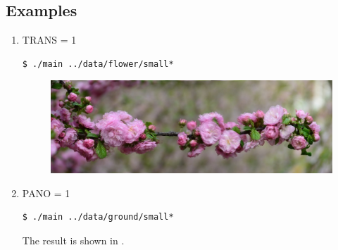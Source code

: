 \subsection{Examples}
\begin{enumerate}
\item TRANS = 1
  \begin{lstlisting}
$ ./main ../data/flower/small*
  \end{lstlisting}
\begin{figure}[H]
  \centering
  \includegraphics[scale=0.27]{res/flower.png}
\end{figure}


  \item PANO = 1
    \begin{lstlisting}
$ ./main ../data/ground/small*
    \end{lstlisting}
    The result is shown in .
\end{enumerate}
